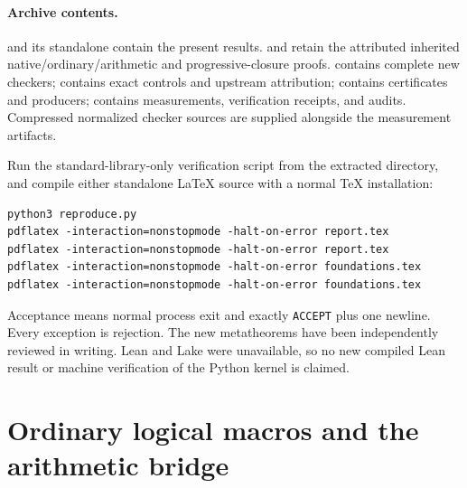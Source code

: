 \documentclass[11pt,a4paper]{article}
\theoremstyle{definition}\newtheorem{definition}[theorem]{Definition}
\begin{document}
\paragraph{Archive contents.}
 and its standalone  contain the present
results.  and  retain the
attributed inherited native/ordinary/arithmetic and progressive-closure
proofs.  contains complete new checkers; 
contains exact controls and upstream attribution;  contains
certificates and producers;  contains measurements,
verification receipts, and audits. Compressed normalized checker sources
are supplied alongside the measurement artifacts.

Run the standard-library-only verification script from the extracted
directory, and compile either standalone LaTeX source with a normal
TeX installation:
\begin{lstlisting}
python3 reproduce.py
pdflatex -interaction=nonstopmode -halt-on-error report.tex
pdflatex -interaction=nonstopmode -halt-on-error report.tex
pdflatex -interaction=nonstopmode -halt-on-error foundations.tex
pdflatex -interaction=nonstopmode -halt-on-error foundations.tex
\end{lstlisting}
Acceptance means normal process exit and exactly \texttt{ACCEPT} plus one
newline. Every exception is rejection. The new metatheorems have been
independently reviewed in writing. Lean and Lake were unavailable, so
no new compiled Lean result or machine verification of the Python
kernel is claimed.

\appendix
\section{Ordinary logical macros and the arithmetic bridge}
\label{sec:macros}
\end{document}
